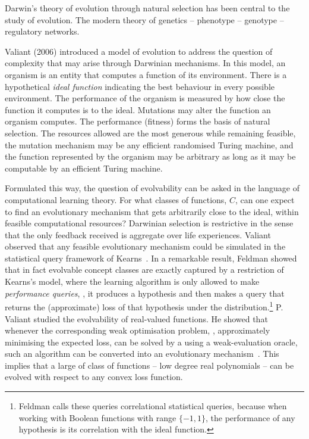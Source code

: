 Darwin's theory of evolution through natural selection has been central to the
study of evolution. The modern theory of genetics  -- phenotype -- genotype --
regulatory networks. 

Valiant (2006) introduced a model of evolution to address the question of
complexity that may arise through Darwinian mechanisms. In this model, an
organism is an entity that computes a function of its environment. There is a
hypothetical \emph{ideal function} indicating the best behaviour in every
possible environment. The performance of the organism is measured by how close
the function it computes is to the ideal. Mutations may alter the function an
organism computes. The performance (fitness) forms the basis of natural
selection. The resources allowed are the most generous while remaining feasible,
the mutation mechanism may be any efficient randomised Turing machine, and the
function represented by the organism may be arbitrary as long as it may be
computable by an efficient Turing machine.

Formulated this way, the question of evolvability can be asked in the language
of computational learning theory. For what classes of functions, $C$, can one
expect to find an evolutionary mechanism that gets arbitrarily close to the
ideal, within feasible computational resources? Darwinian selection is
restrictive in the sense that the only feedback received is aggregate over life
experiences. Valiant observed that any feasible evolutionary mechanism could be
simulated in the statistical query framework of Kearns~\cite{Kearns:1994}. In a
remarkable result, Feldman showed that in fact evolvable concept classes are
exactly captured by a restriction of Kearns's model, where the learning algorithm
is only allowed to make \emph{performance queries}, \ie, it produces a hypothesis
and then makes a query that returns the (approximate) loss of that hypothesis under the
distribution.\footnote{Feldman calls these queries correlational statistical
queries, because when working with Boolean functions with range $\{-1, 1\}$, the
performance of any hypothesis is its correlation with the ideal function.} P.
Valiant studied the evolvability of real-valued functions. He showed that
whenever the corresponding weak optimisation problem, \ie, approximately
minimising the expected loss, can be solved by a using a weak-evaluation oracle,
such an algorithm can be converted into an evolutionary
mechanism~\cite{Valiant:2012-real}. This implies that a large of class of
functions -- low degree real polynomials -- can be evolved with respect to any
convex loss function.

